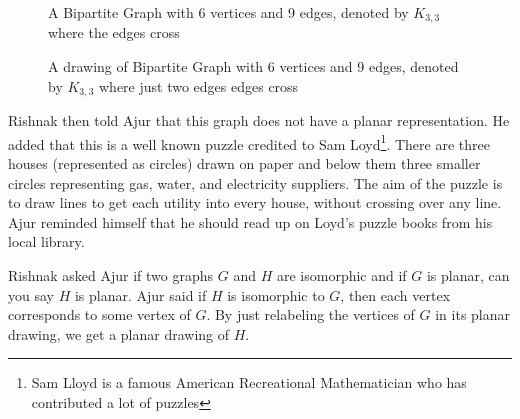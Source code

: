 \begin{figure}
\begin{center}
\caption{ A Bipartite Graph with 6 vertices and 9 edges, denoted by $K_{3,3}$ where the edges cross}\label{9g5}
\end{center}
\end{figure}
\begin{figure}
\begin{center}
\caption{ A  drawing of Bipartite Graph with 6 vertices and 9 edges, denoted by $K_{3,3}$ where just two edges edges cross}\label{9g6}
\end{center}
\end{figure}
Rishnak then told Ajur that this graph does not have a planar representation. He added that this is a well known puzzle credited to Sam Loyd\footnote{Sam Lloyd is a famous American Recreational Mathematician who has contributed a lot of puzzles}. There are three houses (represented as circles) drawn on paper and below them three smaller circles representing gas, water, and electricity suppliers. The aim of the puzzle is to draw lines to get each utility into every house, without crossing over any line. Ajur reminded himself that he should read up on Loyd's puzzle books from his local library.

 Rishnak asked Ajur if two graphs $G$ and $H$ are isomorphic and if $G$ is planar, can you say $H$ is planar. Ajur said if $H$ is isomorphic to $G$, then each vertex corresponds to some vertex of $G$. By just relabeling the vertices of $G$ in its planar drawing, we get a planar drawing of $H$.
 
